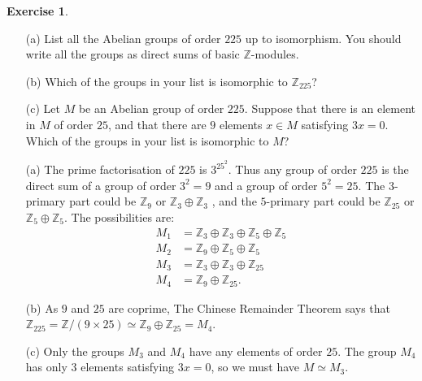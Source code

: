 \documentclass{amsart}
\newcommand{\Z}         {{\mathbb{Z}}}
\newcommand{\tm}        {\times}
\newcommand{\ip}[1]     {\langle #1\rangle}
\newcommand{\op}        {\oplus}
\renewcommand{\:}{\colon}
\theoremstyle{definition}
\newtheorem{exercise}{Exercise}[section]
\renewenvironment{solution}{\SolutionAtEnd}{\endSolutionAtEnd}
\begin{document}
\begin{exercise}
 \begin{itemize}
  \item[(a)] List all the Abelian groups of order $225$ up to
   isomorphism.  You should write all the groups as direct sums of
   basic $\Z$-modules.
  \item[(b)] Which of the groups in your list is isomorphic to
   $\Z_{225}$?
  \item[(c)] Let $M$ be an Abelian group of order $225$.  Suppose that
   there is an element in $M$ of order $25$, and that there are $9$
   elements $x\in M$ satisfying $3x=0$.  Which of the groups in your
   list is isomorphic to $M$?
 \end{itemize}
\end{exercise}
\begin{solution}
 \begin{itemize}
  \item[(a)] The prime factorisation of $225$ is $3^25^2$.  Thus any
   group of order $225$ is the direct sum of a group of order $3^2=9$
   and a group of order $5^2=25$.  The $3$-primary part could be
   $\Z_9$ or $\Z_3\op\Z_3$ , and the $5$-primary part could be
   $\Z_{25}$ or $\Z_5\op\Z_5$.  The possibilities are:
   \begin{align*}
    M_1 &= \Z_3\op\Z_3\op\Z_5\op\Z_5 \\
    M_2 &= \Z_9\op\Z_5\op\Z_5 \\
    M_3 &= \Z_3\op\Z_3\op\Z_{25} \\
    M_4 &= \Z_9\op\Z_{25}.
   \end{align*}
  \item[(b)] As $9$ and $25$ are coprime, The Chinese Remainder
   Theorem says that $\Z_{225}=\Z/(9\tm 25)\simeq\Z_9\op\Z_{25}=M_4$.
  \item[(c)] Only the groups $M_3$ and $M_4$ have any elements of
   order $25$.  The group $M_4$ has only $3$ elements satisfying
   $3x=0$, so we must have $M\simeq M_3$.
 \end{itemize}
\end{solution}
\end{document}
